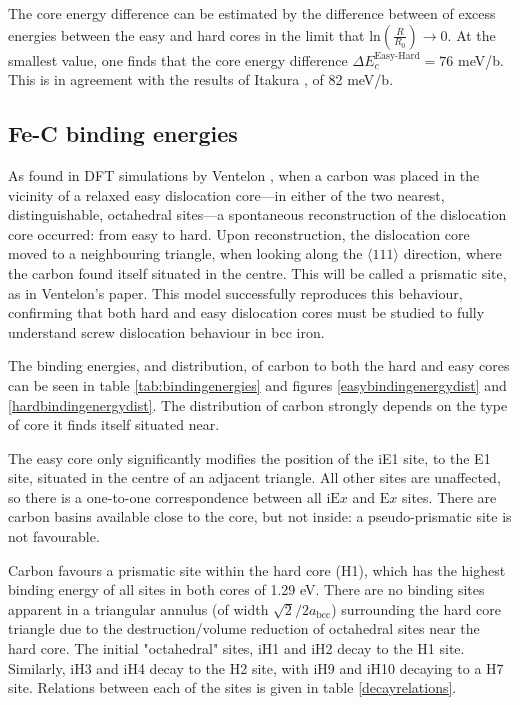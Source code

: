 \documentclass[a4paper,11pt]{article}
\begin{document}
The core energy difference can be estimated by the difference
between of excess energies between the easy and hard cores in the limit
that \(\text{ln}(\frac{R}{R_0}) \rightarrow 0\). At the smallest
value, one finds that the core energy difference \(\Delta
   E_c^{\text{Easy-Hard}} = 76\) meV/b. This is in agreement with the
results of Itakura \cite{Itakura2012}, of 82 meV/b.



\subsection{Fe-C binding energies}
\label{sec:org4ca30d4}



As found in DFT simulations by Ventelon \cite{Ventelon2015}, when a carbon was placed in the
vicinity of a relaxed easy dislocation core---in either of the two nearest, distinguishable,
octahedral sites---a spontaneous reconstruction of the dislocation core occurred: from easy to
hard. Upon reconstruction, the dislocation core moved to a neighbouring triangle, when looking along the \(\langle
   111\rangle\) direction, where the carbon found itself situated in the centre. This will be called a
prismatic site, as in Ventelon's paper. This model successfully
reproduces this behaviour, confirming that both hard and easy dislocation cores must be studied
to fully understand screw dislocation behaviour in bcc iron. 


The binding energies, and distribution, of carbon to both the hard and easy cores can be seen in table
\ref{tab:bindingenergies} and figures \ref{easybindingenergydist} and \ref{hardbindingenergydist}. The
distribution of carbon strongly depends on the type of core it finds itself situated near. 

The easy core only significantly modifies the position of the iE1 site, to the E1 site, situated
in the centre of an adjacent triangle. All other sites are unaffected, so there is a one-to-one
correspondence between all \(\text{iE}x\) and \(\text{E}x\) sites. There are carbon basins available
close to the core, but not inside: a pseudo-prismatic site is not favourable.

Carbon favours a prismatic site within the hard core (H1), which has the highest
binding energy of all sites in both cores of 1.29 eV. There are no binding sites apparent in a triangular
annulus (of width \(\sqrt{2}/2 a_{\text{bcc}}\)) surrounding the hard core triangle due to the
destruction/volume reduction of octahedral sites near the hard core. The initial "octahedral"
sites, iH1 and iH2 decay to the H1 site. Similarly, iH3 and iH4 decay to the H2 site, with iH9
and iH10 decaying to a H7 site. Relations between each of the sites is given in table
\ref{decayrelations}.
\end{document}
